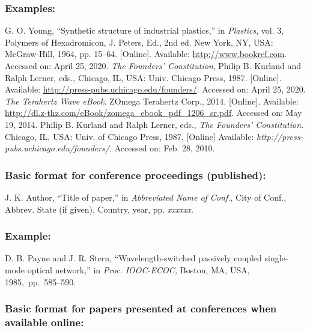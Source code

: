 \documentclass{IEEEoj}
\begin{document}
\subsubsection*{Examples:}

\begin{thebibliography}{00}
 G. O. Young, ``Synthetic structure of industrial
plastics,'' in \emph{Plastics}, vol. 3, Polymers of Hexadromicon, J.
Peters, Ed., 2nd ed. New York, NY, USA: McGraw-Hill, 1964, pp. 15--64.
[Online]. Available: \underline{http://www.bookref.com}. Accessed on: April 25, 2020.
 \textit{The Founders' Constitution}, Philip B. Kurland and Ralph Lerner, eds., Chicago, IL, USA: Univ. Chicago Press, 1987. [Online]. Available: \underline {http://press-pubs.uchicago.edu/founders/}. Accessed on: April 25, 2020.
 \emph{The Terahertz Wave eBook}. ZOmega Terahertz
Corp., 2014. [Online]. Available: \underline{http://dl.z-thz.com/eBook/zomega\_ebook\_pdf\_1206\_sr.pdf}. Accessed on: May 19, 2014.
 Philip B. Kurland and Ralph Lerner, eds., \textit{The
Founders' Constitution. }Chicago, IL, USA: Univ. of Chicago Press, 1987, [Online] Available: \emph{http://press-pubs.uchicago.edu/founders/}. Accessed on: Feb. 28, 2010.
\end{thebibliography}

\subsubsection*{Basic format for conference proceedings (published):}

\begin{thebibliography}{00}
 J. K. Author, ``Title of paper,'' in \textit{Abbreviated Name of Conf.}, City of Conf., Abbrev. State (if
given), Country, year, pp. \textit{xxxxxx.}
\end{thebibliography}

\subsubsection*{Example:}

\begin{thebibliography}{00}
 D. B. Payne and J. R. Stern, ``Wavelength-switched
passively coupled single-mode optical network,'' in \textit{Proc. IOOC-ECOC, }Boston, MA, USA, 1985,~pp.~585--590.
\end{thebibliography}

\subsubsection*{Basic format for papers presented at conferences when available online: }
\end{document}
